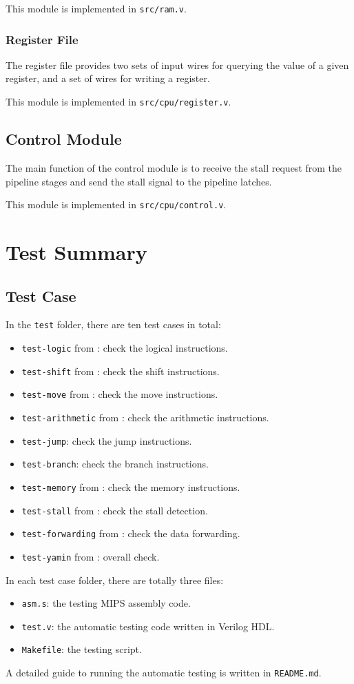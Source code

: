 \documentclass{article}
\begin{document}
This module is implemented in \texttt{src/ram.v}.

\subsubsection{Register File}
The register file provides two sets of input wires for querying the value of a given register, and a set of wires for writing a register.

This module is implemented in \texttt{src/cpu/register.v}.

\subsection{Control Module}
The main function of the control module is to receive the stall request from the pipeline stages and send the stall signal to the pipeline latches.

This module is implemented in \texttt{src/cpu/control.v}.

\section{Test Summary}

\subsection{Test Case}
In the \texttt{test} folder, there are ten test cases in total:
\begin{itemize}
\item
\texttt{test-logic} from \cite{lei2014computer}: check the logical instructions.
\item
\texttt{test-shift} from \cite{lei2014computer}: check the shift instructions.
\item
\texttt{test-move} from \cite{lei2014computer}: check the move instructions.
\item
\texttt{test-arithmetic} from \cite{lei2014computer}: check the arithmetic instructions.
\item
\texttt{test-jump}: check the jump instructions.
\item
\texttt{test-branch}: check the branch instructions.
\item
\texttt{test-memory} from \cite{lei2014computer}: check the memory instructions.
\item
\texttt{test-stall} from \cite{lei2014computer}: check the stall detection.
\item
\texttt{test-forwarding} from \cite{lei2014computer}: check the data forwarding.
\item
\texttt{test-yamin} from \cite{li2011computer}: overall check.
\end{itemize}
In each test case folder, there are totally three files:
\begin{itemize}
\item
\texttt{asm.s}: the testing MIPS assembly code.
\item
\texttt{test.v}: the automatic testing code written in Verilog HDL.
\item
\texttt{Makefile}: the testing script.
\end{itemize}
A detailed guide to running the automatic testing is written in \texttt{README.md}.
\end{document}
